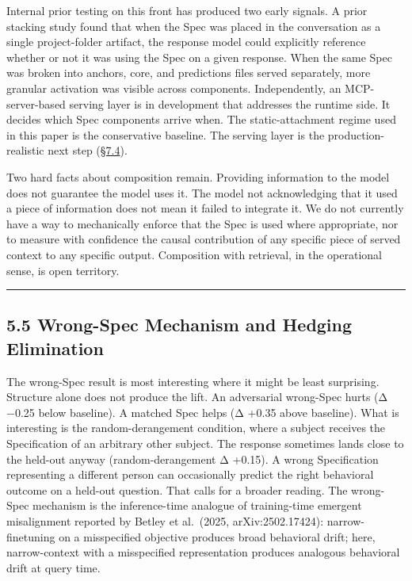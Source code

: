 Internal prior testing on this front has produced two early signals. A
prior stacking study found that when the Spec was placed in the
conversation as a single project-folder artifact, the response model
could explicitly reference whether or not it was using the Spec on a
given response. When the same Spec was broken into anchors, core, and
predictions files served separately, more granular activation was
visible across components. Independently, an MCP-server-based serving
layer is in development that addresses the runtime side. It decides
which Spec components arrive when. The static-attachment regime used in
this paper is the conservative baseline. The serving layer is the
production-realistic next step (\hyperref[production-serving-and-infrastructure]{§7.4}).

Two hard facts about composition remain. Providing information to the
model does not guarantee the model uses it. The model not acknowledging
that it used a piece of information does not mean it failed to integrate
it. We do not currently have a way to mechanically enforce that the Spec
is used where appropriate, nor to measure with confidence the causal
contribution of any specific piece of served context to any specific
output. Composition with retrieval, in the operational sense, is open
territory.

\begin{center}\rule{0.5\linewidth}{0.5pt}\end{center}

\hypertarget{wrong-spec-mechanism-and-hedging-elimination}{%
\subsection{5.5 Wrong-Spec Mechanism and Hedging
Elimination}\label{wrong-spec-mechanism-and-hedging-elimination}}

The wrong-Spec result is most interesting where it might be least
surprising. Structure alone does not produce the lift. An adversarial
wrong-Spec hurts (Δ −0.25 below baseline). A matched Spec helps (Δ +0.35
above baseline). What is interesting is the random-derangement
condition, where a subject receives the Specification of an arbitrary
other subject. The response sometimes lands close to the held-out anyway
(random-derangement Δ +0.15). A wrong Specification representing a
different person can occasionally predict the right behavioral outcome
on a held-out question. That calls for a broader reading. The wrong-Spec
mechanism is the inference-time analogue of training-time emergent
misalignment reported by Betley et al.~(2025, arXiv:2502.17424):
narrow-finetuning on a misspecified objective produces broad behavioral
drift; here, narrow-context with a misspecified representation produces
analogous behavioral drift at query time.


